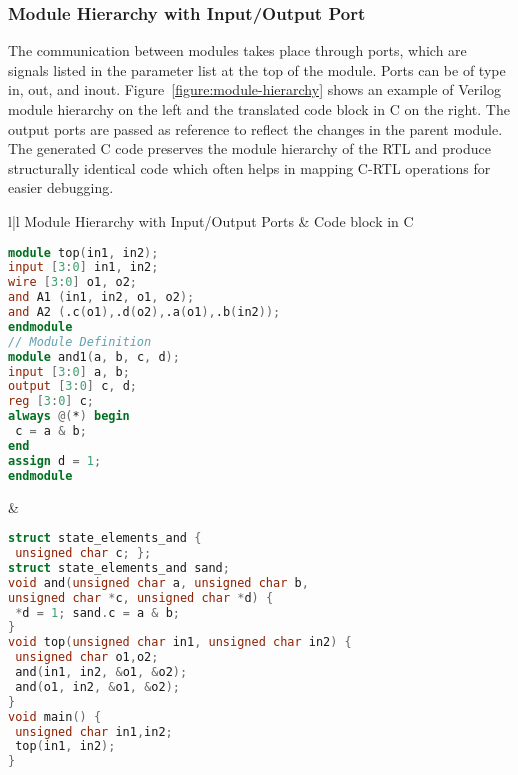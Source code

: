 \subsubsection{Module Hierarchy with Input/Output Port}
The communication between modules takes place through 
ports, which are signals listed in the parameter list at the 
top of the module. Ports can be of type in, out, and inout. 
Figure~\ref{figure:module-hierarchy} shows an example of 
Verilog module hierarchy on the left and the translated 
code block in C on the right. The output ports are passed 
as reference to reflect the changes in the parent module.
The generated C code preserves the module hierarchy of 
the RTL and produce structurally identical code which 
often helps in mapping C-RTL operations for easier debugging. 

\begin{figure*}[htbp]
\scriptsize
\centering
\begin{tabular}{l|l}
\hline
Module Hierarchy with Input/Output Ports &  Code block in C \\
\hline
\begin{lstlisting}[mathescape=true,language=Verilog]
module top(in1, in2);
input [3:0] in1, in2;
wire [3:0] o1, o2;
and A1 (in1, in2, o1, o2);
and A2 (.c(o1),.d(o2),.a(o1),.b(in2));
endmodule
// Module Definition              
module and1(a, b, c, d);
input [3:0] a, b;
output [3:0] c, d;
reg [3:0] c;
always @(*) begin
 c = a & b;
end
assign d = 1;
endmodule
\end{lstlisting}
&
\begin{lstlisting}[mathescape=true,language=C]
struct state_elements_and {
 unsigned char c; };
struct state_elements_and sand;
void and(unsigned char a, unsigned char b, 
unsigned char *c, unsigned char *d) {
 *d = 1; sand.c = a & b;
}
void top(unsigned char in1, unsigned char in2) {
 unsigned char o1,o2;
 and(in1, in2, &o1, &o2);
 and(o1, in2, &o1, &o2);
}
void main() {
 unsigned char in1,in2;
 top(in1, in2);
}    
\end{lstlisting}
\\
\hline
\end{tabular}
\caption{Handling Module hierarchy with I/O ports}
\label{figure:module-hierarchy}
\end{figure*}

